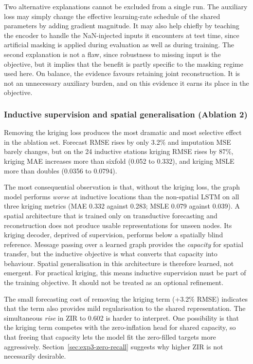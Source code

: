 Two alternative explanations cannot be excluded from a single run. The
auxiliary loss may simply change the effective learning-rate schedule
of the shared parameters by adding gradient magnitude. It may also help
chiefly by teaching the encoder to handle the NaN-injected inputs it
encounters at test time, since artificial masking is applied during
evaluation as well as during training. The second explanation is not a
flaw, since robustness to missing input is the objective, but it implies
that the benefit is partly specific to the masking regime used here. On
balance, the evidence favours retaining joint reconstruction. It is not
an unnecessary auxiliary burden, and on this evidence it earns its
place in the objective.

\subsubsection{Inductive supervision and spatial generalisation (Ablation 2)}
\label{sec:exp3-abl-kriging}

Removing the kriging loss produces the most dramatic and most selective
effect in the ablation set. Forecast RMSE rises by only 3.2\% and
imputation MSE barely changes, but on the 24 inductive stations kriging
RMSE rises by 87\%, kriging MAE increases more than sixfold (0.052 to
0.332), and kriging MSLE more than doubles (0.0356 to 0.0794).

The most consequential observation is that, without the kriging loss,
the graph model performs \emph{worse} at inductive locations than the
non-spatial LSTM on all three kriging metrics (MAE 0.332 against 0.283;
MSLE 0.079 against 0.039). A spatial architecture that is trained only
on transductive forecasting and reconstruction does not produce usable
representations for unseen nodes. Its kriging decoder, deprived of
supervision, performs below a spatially blind reference. Message passing
over a learned graph provides the \emph{capacity} for spatial transfer,
but the inductive objective is what converts that capacity into
behaviour. Spatial generalisation in this architecture is therefore
learned, not emergent. For practical kriging, this means inductive
supervision must be part of the training objective. It should not be
treated as an optional refinement.

The small forecasting cost of removing the kriging term (+3.2\% RMSE)
indicates that the term also provides mild regularisation to the shared
representation. The simultaneous \emph{rise} in ZIR to 0.602 is
harder to interpret. One possibility is that the kriging term competes
with the zero-inflation head for shared capacity, so that freeing that
capacity lets the model fit the zero-filled targets more aggressively.
Section~\ref{sec:exp3-zero-recall} suggests why higher ZIR is not
necessarily desirable.

